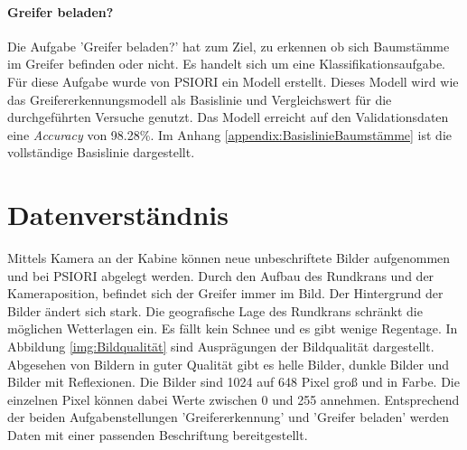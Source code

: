 	\paragraph{Greifer beladen?} Die Aufgabe 'Greifer beladen?' hat zum Ziel, zu erkennen ob sich Baumstämme im Greifer befinden oder nicht. Es handelt sich um eine Klassifikationsaufgabe. Für diese Aufgabe wurde von PSIORI ein Modell erstellt. Dieses Modell wird wie das Greifererkennungsmodell als Basislinie und Vergleichswert für die durchgeführten Versuche genutzt. Das Modell erreicht auf den Validationsdaten eine \textit{Accuracy} von 98.28\%. Im Anhang \ref{appendix:BasislinieBaumstämme} ist die vollständige Basislinie dargestellt. 

	\section{Datenverständnis}
	\label{sec:DataUnderstanding}
	Mittels Kamera an der Kabine können neue unbeschriftete Bilder aufgenommen und bei PSIORI abgelegt werden. Durch den Aufbau des Rundkrans und der Kameraposition, befindet sich der Greifer immer im Bild. Der Hintergrund der Bilder ändert sich stark. Die geografische Lage des Rundkrans schränkt die möglichen Wetterlagen ein. Es fällt kein Schnee und es gibt wenige Regentage. In Abbildung  \ref{img:Bildqualität} sind Ausprägungen der Bildqualität dargestellt. Abgesehen von Bildern in guter Qualität gibt es helle Bilder, dunkle Bilder und Bilder mit Reflexionen. Die Bilder sind 1024 auf 648 Pixel groß und in Farbe. Die einzelnen Pixel können dabei Werte zwischen 0 und 255 annehmen. 
	Entsprechend der beiden Aufgabenstellungen 'Greifererkennung' und 'Greifer beladen' werden Daten mit einer passenden Beschriftung bereitgestellt.	
